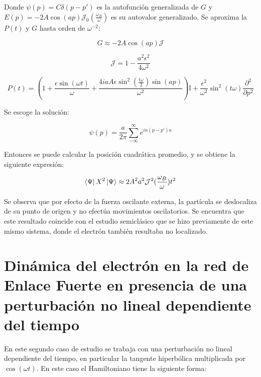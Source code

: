 Donde $\psi(p)=C\delta(p-p')$ es la autofunción generalizada de $G$ y $E(p)=-2A\cos(a p)\mathcal{J}_0(\frac{\omega_B}{\omega})$ es su autovalor generalizado. Se aproxima la $P(t)$ y $G$ hasta orden de $\omega^{-2}$:

\begin{equation}\label{eq:10.25}
    G \approx -2A\cos (a p)\mathcal{J}
\end{equation}

\begin{equation}
    \mathcal{J}=1-\frac{a^2 \epsilon^2  }{4 \omega^2}
\end{equation}

\begin{equation}\label{eq:10.26}
    P(t)=\left(1+\frac{\epsilon\sin(\omega t)}{\omega}+\frac{4iaA\epsilon\sin^2(\frac{t\omega}{2})\sin(ap)}{\omega^2}\right)\mathbb{I}+\frac{\epsilon^2}{\omega^2}\sin^2(t\omega)\frac{\partial^2}{\partial p^2}
\end{equation}
 
 Se escoge la solución:
 
 \begin{equation}\label{eq:10.27}
     \psi(p)=\frac{a}{2\pi}\sum^{\infty}_{-\infty} e^{in(p-p')a}
 \end{equation}
 
Entonces se puede calcular la posición cuadrática promedio, y se obtiene la siguiente expresión:

\begin{equation}\label{eq:10.28}
    \bra{\Psi}X^2\ket{\Psi}\approx 2A^2a^2\mathcal{J}^2(\frac{\omega_B}{\omega})t^2
\end{equation}

Se observa que por efecto de la fuerza oscilante externa, la partícula se deslocaliza de su punto de origen y no efectúa movimientos oscilatorios. Se encuentra que este resultado coincide con el estudio semiclásico que se hizo previamente de este mismo sistema, donde el electrón también resultaba no localizado.

\section{Dinámica del electrón en la red de Enlace Fuerte en presencia de una perturbación no lineal dependiente del tiempo}

En este segundo caso de estudio se trabaja con una perturbación no lineal dependiente del tiempo, en particular la tangente hiperbólica multiplicada por $\cos(\omega t)$. En este caso el Hamiltoniano tiene la siguiente forma:

